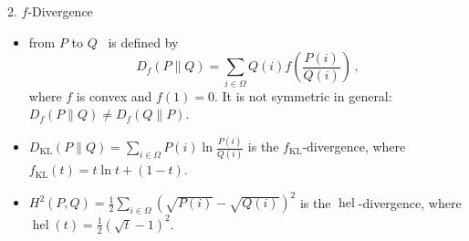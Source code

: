 \documentclass[final]{beamer}
\DeclareMathOperator{\hel}{hel}
\newcommand{\kl}[2]{D_{\mathrm{KL}}( #1 \parallel #2 )}
\newlength{\onecolwid}
\begin{document}
\begin{frame}[t]
\begin{columns}[t]
\begin{column}{\onecolwid}
		
	\begin{block}{2. $ f $-Divergence}
\begin{itemize}	
		\item	{}  from $ P $ 
		to $ Q $~\cite{csiszar1964informationstheoretische}  
			is defined by
			\begin{equation}\label{eq:definition_f_divergence}
			D_f(P\parallel Q) = \sum_{i\in \Omega} Q(i) f\left( 
			\frac{P(i)}{Q(i)} 
			\right) \,,
			\end{equation}
			where $ f $ is convex and $ f(1)=0 $.
			It is not symmetric in general: $ D_f(P\parallel 
			Q)\ne 
			D_f(Q\parallel P) $.
			
			\item {} $ \kl{P}{Q}= \sum_{i\in 
			\Omega} P(i) \ln\frac{P(i)}{Q(i)}  $ is the $ 
			f_{\mathrm{KL}} 
			$-divergence,
			where
			 $ f_{\mathrm{KL}}(t) = t\ln t + (1-t) $.
			
		\item	{}
	 $ H^2(P,Q) = 
		\frac{1}{2} \sum_{i\in \Omega} 
		(\sqrt{P(i)}-\sqrt{Q(i)})^2 $ is 
		the $ \hel 
		$-divergence, where
			 $ \hel(t)=\frac{1}{2}(\sqrt{t}-1)^2 $.

			

\end{itemize}
\end{block}
\end{column}
\end{columns}
\end{frame}
\end{document}
